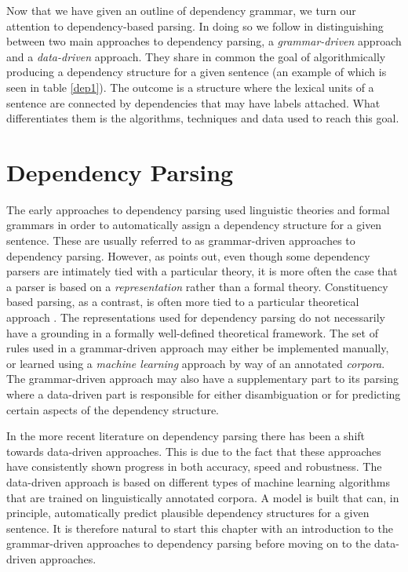 Now that we have given an outline of dependency grammar, we turn our attention to dependency-based parsing. In doing so we follow  in distinguishing between two main approaches to dependency parsing, a \textit{grammar-driven} approach and a \textit{data-driven} approach. They share in common the goal of algorithmically producing a dependency structure for a given sentence (an example of which is seen in table \ref{dep1}). The outcome is a structure where the lexical units of a sentence are connected by dependencies that may have labels attached. What differentiates them is the algorithms, techniques and data used to reach this goal.

\section{Dependency Parsing}
\label{parsing}

The early approaches to dependency parsing used linguistic theories and formal grammars in order to automatically assign a dependency structure for a given sentence. These are usually referred to as grammar-driven approaches to dependency parsing. However, as \citeauthor{Niv:05} points out, even though some dependency parsers are intimately tied with a particular theory, it is more often the case that a parser is based on a \textit{representation} rather than a formal theory. Constituency based parsing, as a contrast, is often more tied to a particular theoretical approach \cite{Niv:05}. The representations used for dependency parsing do not necessarily have a grounding in a formally well-defined theoretical framework. The set of rules used in a grammar-driven approach may either be implemented manually, or learned using a \textit{machine learning} approach by way of an annotated \textit{corpora}. The grammar-driven approach may also have a supplementary part to its parsing where a data-driven part is responsible for either disambiguation or for predicting certain aspects of the dependency structure.

In the more recent literature on dependency parsing there has been a shift towards data-driven approaches. This is due to the fact that these approaches have consistently shown progress in both accuracy, speed and robustness. The data-driven approach is based on different types of machine learning algorithms that are trained on linguistically annotated corpora. A model is built that can, in principle, automatically predict plausible dependency structures for a given sentence. It is therefore natural to start this chapter with an introduction to the grammar-driven approaches to dependency parsing before moving on to the data-driven approaches.

